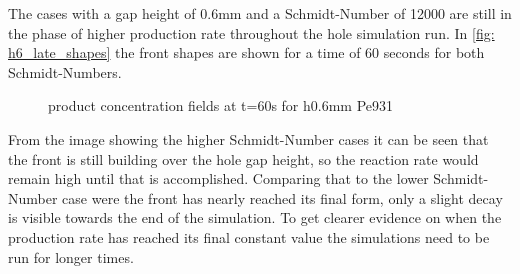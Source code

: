 \documentclass[../thesis.tex]{subfiles}
\begin{document}
The cases with a gap height of 0.6mm and a Schmidt-Number of 12000 are still in the phase of higher production rate throughout the hole simulation run. In \autoref{fig: h6_late_shapes} the front shapes are shown for a time of 60 seconds for both Schmidt-Numbers.
\begin{figure}[htb]
	\centering
	\qquad
	\caption{product concentration fields at t=60s for h0.6mm Pe931}%
	\label{fig: h6_late_shapes}%
\end{figure}
From the image showing the higher Schmidt-Number cases it can be seen that the front is still building over the hole gap height, so the reaction rate would remain high until that is accomplished. Comparing that to the lower Schmidt-Number case were the front has nearly reached its final form, only a slight decay is visible towards the end of the simulation. To get clearer evidence on when the production rate has reached its final constant value the simulations need to be run for longer times.
\end{document}
